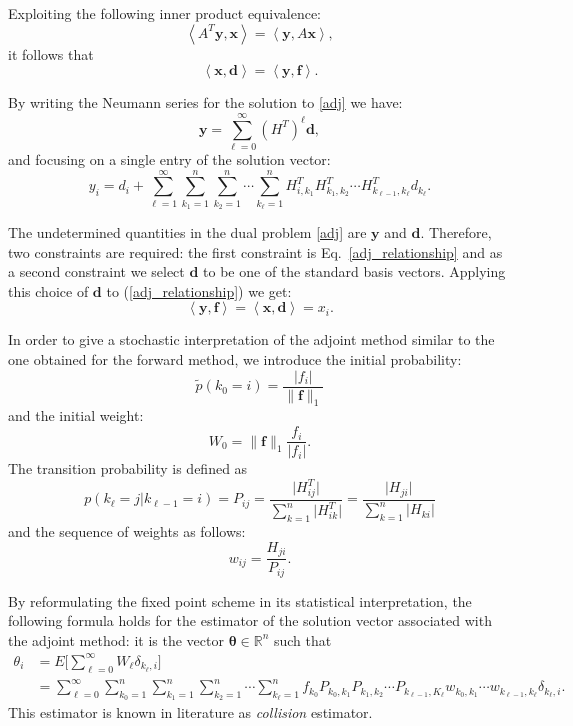 \documentclass[final,leqno,onefignum,onetabnum]{siamltex1213}
\begin{document}
Exploiting the following inner product equivalence:
\[
\left\langle
A^T\mathbf{y},\mathbf{x}\right\rangle=\left\langle\mathbf{y},A\mathbf{x}
\right\rangle ,
\]
it follows that
\begin{equation}
\left\langle\mathbf{x},\mathbf{d}\right\rangle=\left\langle\mathbf{y},\mathbf{f}
\right\rangle.
\label{adj_relationship}
\end{equation}

By writing the Neumann series for the solution to \eqref{adj} we have:
\[
\mathbf{y}=\sum_{\ell=0}^{\infty} (H^T)^\ell \mathbf{d},
\]
and focusing on a single entry of the solution vector:
\[
y_i = d_i + \sum_{\ell=1}^{\infty}\sum_{k_1=1}^{n}\sum_{k_2=1}^n
\cdots \sum_{k_{\ell}=1}^n H^T_{i,k_1} H^T_{k_1,k_2}\cdots
H^T_{k_{\ell-1},k_{\ell}} d_{k_\ell}.
\]

The undetermined quantities in the dual problem \eqref{adj} are $\mathbf{y}$
and
$\mathbf{d}$. Therefore, two constraints are required: the first constraint is
Eq.~\eqref{adj_relationship} and as a second constraint we select
$\mathbf{d}$ to be one of the standard basis vectors.
Applying this choice of $\mathbf{d}$ to (\ref{adj_relationship}) we get:
\[
\left\langle\mathbf{y},\mathbf{f}\right\rangle=\left\langle\mathbf{x},\mathbf{d}
\right\rangle=x_i.
\]

In order to give a stochastic interpretation of the adjoint method similar to
the one obtained for the forward method, we introduce the initial probability:
\[
\tilde{p}(k_0=i)=\frac{\lvert f_i\rvert}{\lVert
\mathbf{f}\rVert_1}
\]
and the initial weight:
\[
W_0 = \lVert \mathbf{f}\rVert_1\frac{f_i}{\lvert f_i \rvert}.
\]
The transition probability is defined as
\[
p(k_\ell = j \lvert k_{\ell-1}=i)=P_{ij}=\frac{\lvert
H^T_{ij}\rvert}{\sum_{k=1}^n \lvert H^T_{ik}\rvert} = \frac{\lvert
H_{ji}\rvert}{\sum_{k=1}^n \lvert H_{ki}\rvert}
\]
and the sequence of weights as follows:
\[
w_{ij}=\frac{H_{ji}}{P_{ij}}.
\]

By reformulating the fixed point scheme in its statistical interpretation, the
following formula
holds for the estimator of the solution vector associated with the adjoint
method: it is the vector $\boldsymbol{\theta}\in \mathbb{R}^n$ such that
\begin{equation}
\begin{array}{rl}
\theta_i& =E\bigg[\sum_{\ell=0}^\infty W_{\ell}\delta_{k_{\ell},
i}\bigg]\\
&={\displaystyle \sum_{\ell=0}^{\infty}\sum_{k_0=1}^n\sum_{k_1=1}^n\sum_{k_2=1}
^n\cdots\sum_ { k_ { \ell }=1 } ^n
f_{k_0}P_{k_0,k_1}P_{k_1,k_2}\cdots
P_{k_{\ell-1},K_{\ell}}w_{k_0,k_1}\cdots
w_{k_{\ell-1},k_{\ell}}\delta_{k_{\ell},i}.}
\label{adj_mean}
\end{array}
\end{equation}
This estimator is known in literature as \textit{collision} estimator.
\end{document}
